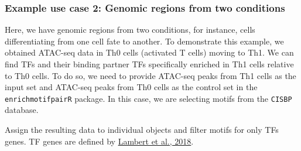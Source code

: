 \documentclass[
]{article}
\newenvironment{Shaded}{}{}
\newcommand{\AttributeTok}[1]{\textcolor[rgb]{0.49,0.56,0.16}{#1}}
\newcommand{\CommentTok}[1]{\textcolor[rgb]{0.38,0.63,0.69}{\textit{#1}}}
\newcommand{\ConstantTok}[1]{\textcolor[rgb]{0.53,0.00,0.00}{#1}}
\newcommand{\FloatTok}[1]{\textcolor[rgb]{0.25,0.63,0.44}{#1}}
\newcommand{\FunctionTok}[1]{\textcolor[rgb]{0.02,0.16,0.49}{#1}}
\newcommand{\NormalTok}[1]{#1}
\newcommand{\OtherTok}[1]{\textcolor[rgb]{0.00,0.44,0.13}{#1}}
\newcommand{\SpecialCharTok}[1]{\textcolor[rgb]{0.25,0.44,0.63}{#1}}
\newcommand{\StringTok}[1]{\textcolor[rgb]{0.25,0.44,0.63}{#1}}
\begin{document}
\hypertarget{example-use-case-2-genomic-regions-from-two-conditions}{%
\subsubsection{Example use case 2: Genomic regions from two
conditions}\label{example-use-case-2-genomic-regions-from-two-conditions}}

Here, we have genomic regions from two conditions, for instance, cells
differentiating from one cell fate to another. To demonstrate this
example, we obtained ATAC-seq data in Th0 cells (activated T cells)
moving to Th1. We can find TFs and their binding partner TFs
specifically enriched in Th1 cells relative to Th0 cells. To do so, we
need to provide ATAC-seq peaks from Th1 cells as the input set and
ATAC-seq peaks from Th0 cells as the control set in the
\texttt{enrichmotifpairR} package. In this case, we are selecting motifs
from the \texttt{CISBP} database.

\begin{Shaded}
\end{Shaded}

Assign the resulting data to individual objects and filter motifs for
only TFs genes. TF genes are defined by
\href{https://pubmed.ncbi.nlm.nih.gov/29425488/}{Lambert et al., 2018}.
\end{document}
